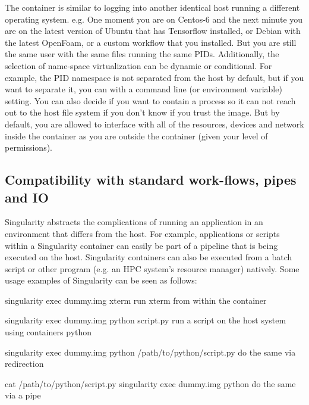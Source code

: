 \documentclass[letterpaper,10pt,english]{sphinxmanual}
\begin{document}
The container is similar to logging into another identical host running
a different operating system. e.g. One moment you are on Centos-6 and the next minute
you are on the latest version of Ubuntu that has Tensorflow installed,
or Debian with the latest OpenFoam, or a custom workflow that you
installed. But you are still the same user with the same files running
the same PIDs.
Additionally, the selection of name-space virtualization can be
dynamic or conditional. For example, the PID namespace is not
separated from the host by default, but if you want to separate it,
you can with a command line (or environment variable) setting. You can
also decide if you want to contain a process so it can not reach out to
the host file system if you don’t know if you trust the image. But by
default, you are allowed to interface with all of the resources,
devices and network inside the container as you are outside the
container (given your level of permissions).


\subsection{Compatibility with standard work-flows, pipes and IO}
\label{\detokenize{introduction:compatibility-with-standard-work-flows-pipes-and-io}}
Singularity abstracts the complications of running an application in
an environment that differs from the host. For example, applications
or scripts within a Singularity container can easily be part of a
pipeline that is being executed on the host. Singularity containers
can also be executed from a batch script or other program (e.g. an HPC
system’s resource manager) natively.
Some usage examples of Singularity can be seen as follows:

%
\begin{sphinxVerbatim}[commandchars=\\\{\}]
\PYGZdl{} singularity exec dummy.img xterm  \PYGZsh{} run xterm from within the container

\PYGZdl{} singularity exec dummy.img python script.py  \PYGZsh{} run a script on the host system using container\PYGZsq{}s python

\PYGZdl{} singularity exec dummy.img python \PYGZlt{} /path/to/python/script.py  \PYGZsh{} do the same via redirection

\PYGZdl{} cat /path/to/python/script.py \textbar{} singularity exec dummy.img python  \PYGZsh{} do the same via a pipe
\end{sphinxVerbatim}
\end{document}
